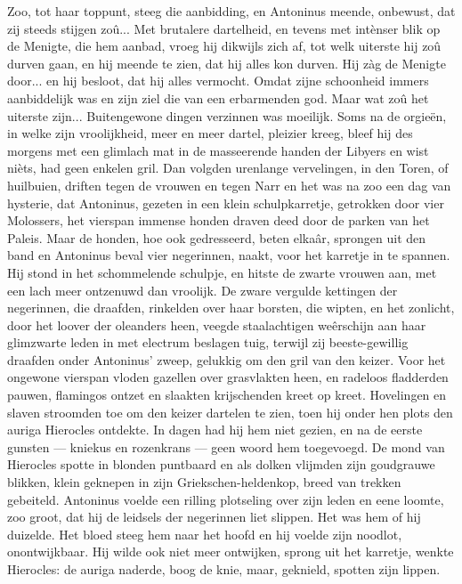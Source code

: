\documentclass[a4paper, 12pt, oneside, dutch]{article}
\begin{document}
Zoo, tot haar toppunt, steeg die aanbidding, en Antoninus meende, onbewust, dat zij steeds stijgen zoû... Met brutalere dartelheid, en tevens met intènser blik op de Menigte, die hem aanbad, vroeg hij dikwijls zich af, tot welk uiterste hij zoû durven gaan, en hij meende te zien, dat hij alles kon durven. Hij zàg de Menigte door... en hij besloot, dat hij alles vermocht. Omdat zijne schoonheid immers aanbiddelijk was en zijn ziel die van een erbarmenden god. Maar wat zoû het uiterste zijn... Buitengewone dingen verzinnen was moeilijk. Soms na de orgieën, in welke zijn vroolijkheid, meer en meer dartel, pleizier kreeg, bleef hij des morgens met een glimlach mat in de masseerende handen der Libyers en wist nièts, had geen enkelen gril. Dan volgden urenlange vervelingen, in den Toren, of huilbuien, driften tegen de vrouwen en tegen Narr en het was na zoo een dag van hysterie, dat Antoninus, gezeten in een klein schulpkarretje, getrokken door vier Molossers, het vierspan immense honden draven deed door de parken van het Paleis. Maar de honden, hoe ook gedresseerd, beten elkaâr, sprongen uit den band en Antoninus beval vier negerinnen, naakt, voor het karretje in te spannen. Hij stond in het schommelende schulpje, en hitste de zwarte vrouwen aan, met een lach meer ontzenuwd dan vroolijk. De zware vergulde kettingen der negerinnen, die draafden, rinkelden over haar borsten, die wipten, en het zonlicht, door het loover der oleanders heen, veegde staalachtigen weêrschijn aan haar glimzwarte leden in met electrum beslagen tuig, terwijl zij beeste-gewillig draafden onder Antoninus' zweep, gelukkig om den gril van den keizer. Voor het ongewone vierspan vloden gazellen over grasvlakten heen, en radeloos fladderden pauwen, flamingos ontzet en slaakten krijschenden kreet op kreet. Hovelingen en slaven stroomden toe om den keizer dartelen te zien, toen hij onder hen plots den auriga Hierocles ontdekte. In dagen had hij hem niet gezien, en na de eerste gunsten --- kniekus en rozenkrans --- geen woord hem toegevoegd. De mond van Hierocles spotte in blonden puntbaard en als dolken vlijmden zijn goudgrauwe blikken, klein geknepen in zijn Griekschen-heldenkop, breed van trekken gebeiteld. Antoninus voelde een rilling plotseling over zijn leden en eene loomte, zoo groot, dat hij de leidsels der negerinnen liet slippen. Het was hem of hij duizelde. Het bloed steeg hem naar het hoofd en hij voelde zijn noodlot, onontwijkbaar. Hij wilde ook niet meer ontwijken, sprong uit het karretje, wenkte Hierocles: de auriga naderde, boog de knie, maar, geknield, spotten zijn lippen.
\end{document}
